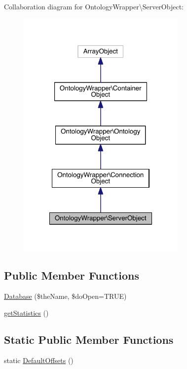 Collaboration diagram for Ontology\-Wrapper\textbackslash{}Server\-Object\-:\nopagebreak
\begin{figure}[H]
\begin{center}
\leavevmode
\includegraphics[width=234pt]{class_ontology_wrapper_1_1_server_object__coll__graph}
\end{center}
\end{figure}
\subsection*{Public Member Functions}
\begin{DoxyCompactItemize}
\item 
\hyperlink{class_ontology_wrapper_1_1_server_object_a6495069ecd1e2836754c4c037c3bb074}{Database} (\$the\-Name, \$do\-Open=T\-R\-U\-E)
\item 
\hyperlink{class_ontology_wrapper_1_1_server_object_afdff50c16982e3266578d75d1fb19dea}{get\-Statistics} ()
\end{DoxyCompactItemize}
\subsection*{Static Public Member Functions}
\begin{DoxyCompactItemize}
\item 
static \hyperlink{class_ontology_wrapper_1_1_server_object_a6c7ca6d64f94b7b9b6c3bac5f5ea4751}{Default\-Offsets} ()
\end{DoxyCompactItemize}
